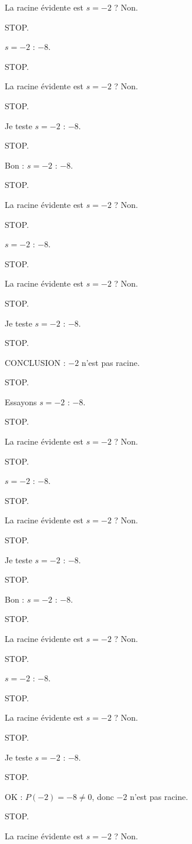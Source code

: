 \documentclass[11pt]{article}
\begin{document}
\begin{exoresolu}
\begin{enumerate}
La racine évidente est $s = -2$ ? Non. 

STOP. 

$s = -2$ : $-8$. 

STOP. 

La racine évidente est $s = -2$ ? Non. 

STOP. 

Je teste $s = -2$ : $-8$. 

STOP. 

Bon : $s = -2$ : $-8$. 

STOP. 

La racine évidente est $s = -2$ ? Non. 

STOP. 

$s = -2$ : $-8$. 

STOP. 

La racine évidente est $s = -2$ ? Non. 

STOP. 

Je teste $s = -2$ : $-8$. 

STOP. 

CONCLUSION : $-2$ n'est pas racine. 

STOP. 

Essayons $s = -2$ : $-8$. 

STOP. 

La racine évidente est $s = -2$ ? Non. 

STOP. 

$s = -2$ : $-8$. 

STOP. 

La racine évidente est $s = -2$ ? Non. 

STOP. 

Je teste $s = -2$ : $-8$. 

STOP. 

Bon : $s = -2$ : $-8$. 

STOP. 

La racine évidente est $s = -2$ ? Non. 

STOP. 

$s = -2$ : $-8$. 

STOP. 

La racine évidente est $s = -2$ ? Non. 

STOP. 

Je teste $s = -2$ : $-8$. 

STOP. 

OK : $P(-2) = -8 \neq 0$, donc $-2$ n'est pas racine. 

STOP. 

La racine évidente est $s = -2$ ? Non. 


\end{enumerate}
\end{exoresolu}
\end{document}
